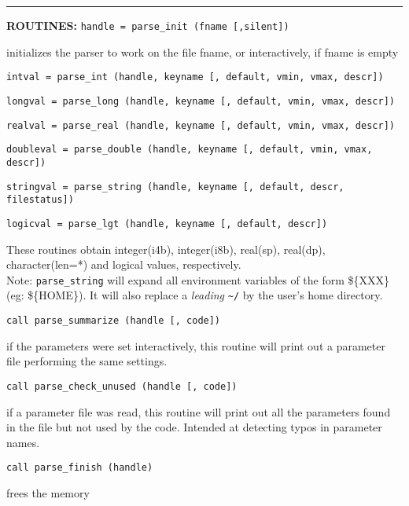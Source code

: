 \rule{\hsize}{0.7mm}
\textsc{\large{\textbf{ROUTINES: }}}\hfill\newline
{\tt handle = parse\_init (fname [,silent])} 

\quad initializes the parser to work on the file fname, or interactively, if fname is empty

{\tt intval = parse\_int (handle, keyname [, default, vmin, vmax, descr])} 

{\tt longval = parse\_long (handle, keyname [, default, vmin, vmax, descr])} 

{\tt realval = parse\_real (handle, keyname [, default, vmin, vmax, descr])} 

{\tt doubleval = parse\_double (handle, keyname [, default, vmin, vmax, descr])} 

{\tt stringval = parse\_string (handle, keyname [, default, descr, filestatus])} 

{\tt logicval = parse\_lgt (handle, keyname [, default, descr])} 

\quad These routines obtain integer(i4b), integer(i8b), real(sp), real(dp), character(len=*) and logical values,
respectively. \\
Note: {\tt parse\_string} will expand all environment variables of
the form \$\{XXX\} (eg: \$\{HOME\}). It will also replace a {\em leading} 
\verb+~+$\!${\tt /}
by the user's home directory.

{\tt call parse\_summarize (handle [, code])}

\quad if the parameters were set interactively, this routine will print out a 
parameter file performing the same settings.

{\tt call parse\_check\_unused (handle [, code])}

\quad if a parameter file was read, this routine will print out all the parameters
found in the file but not used by the code. Intended at detecting typos in
parameter names.

{\tt call parse\_finish (handle)}

\quad frees the memory

